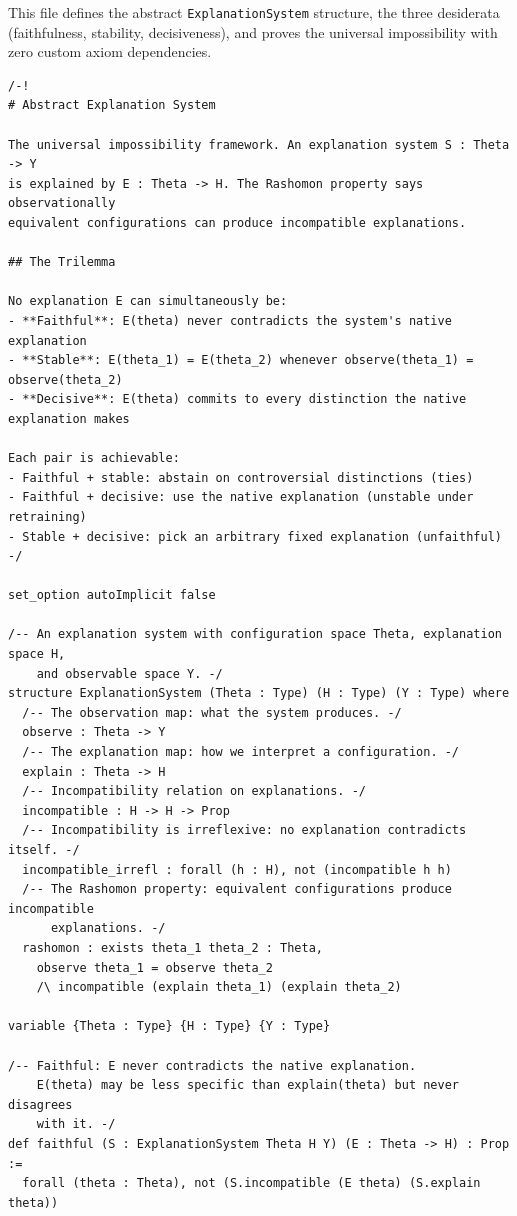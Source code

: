 \documentclass[11pt,a4paper]{article}
\begin{document}
This file defines the abstract \texttt{ExplanationSystem} structure, the three
desiderata (faithfulness, stability, decisiveness), and proves the universal
impossibility with zero custom axiom dependencies.

\begin{lstlisting}[caption={ExplanationSystem.lean --- complete file},label={lst:explanation-system}]
/-!
# Abstract Explanation System

The universal impossibility framework. An explanation system S : Theta -> Y
is explained by E : Theta -> H. The Rashomon property says observationally
equivalent configurations can produce incompatible explanations.

## The Trilemma

No explanation E can simultaneously be:
- **Faithful**: E(theta) never contradicts the system's native explanation
- **Stable**: E(theta_1) = E(theta_2) whenever observe(theta_1) = observe(theta_2)
- **Decisive**: E(theta) commits to every distinction the native explanation makes

Each pair is achievable:
- Faithful + stable: abstain on controversial distinctions (ties)
- Faithful + decisive: use the native explanation (unstable under retraining)
- Stable + decisive: pick an arbitrary fixed explanation (unfaithful)
-/

set_option autoImplicit false

/-- An explanation system with configuration space Theta, explanation space H,
    and observable space Y. -/
structure ExplanationSystem (Theta : Type) (H : Type) (Y : Type) where
  /-- The observation map: what the system produces. -/
  observe : Theta -> Y
  /-- The explanation map: how we interpret a configuration. -/
  explain : Theta -> H
  /-- Incompatibility relation on explanations. -/
  incompatible : H -> H -> Prop
  /-- Incompatibility is irreflexive: no explanation contradicts itself. -/
  incompatible_irrefl : forall (h : H), not (incompatible h h)
  /-- The Rashomon property: equivalent configurations produce incompatible
      explanations. -/
  rashomon : exists theta_1 theta_2 : Theta,
    observe theta_1 = observe theta_2
    /\ incompatible (explain theta_1) (explain theta_2)

variable {Theta : Type} {H : Type} {Y : Type}

/-- Faithful: E never contradicts the native explanation.
    E(theta) may be less specific than explain(theta) but never disagrees
    with it. -/
def faithful (S : ExplanationSystem Theta H Y) (E : Theta -> H) : Prop :=
  forall (theta : Theta), not (S.incompatible (E theta) (S.explain theta))


\end{lstlisting}
\end{document}
